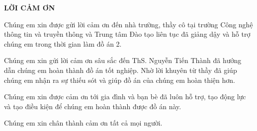 \documentclass[../DoAn.tex]{subfiles}
\begin{document}
    \begin{center}
        \Large{\textbf{LỜI CẢM ƠN}}\\
    \end{center}
    \vspace{1cm}
    
    Chúng em xin được gửi lời cảm ơn đến nhà trường, thầy cô tại trường Công nghệ thông tin và truyền thông và Trung tâm Đào tạo liên tục đã giảng dậy và hỗ trợ chúng em trong thời gian làm đồ án 2.
    
    Chúng em xin gửi lời cảm ơn sâu sắc đến ThS. Nguyễn Tiến Thành đã hướng dẫn chúng em hoàn thành đồ án tốt nghiệp. Nhờ lời khuyên từ thầy đã giúp chúng em nhận ra sự thiếu sót và giúp đồ án của chúng em hoàn thiện hơn.
    
    Chúng em xin được cảm ơn tới gia đình và bạn bè đã luôn hỗ trợ, tạo động lực và tạo điều kiện để chúng em hoàn thành được đồ án này.

    Chúng em xin chân thành cảm ơn tất cả mọi người.
\end{document}
